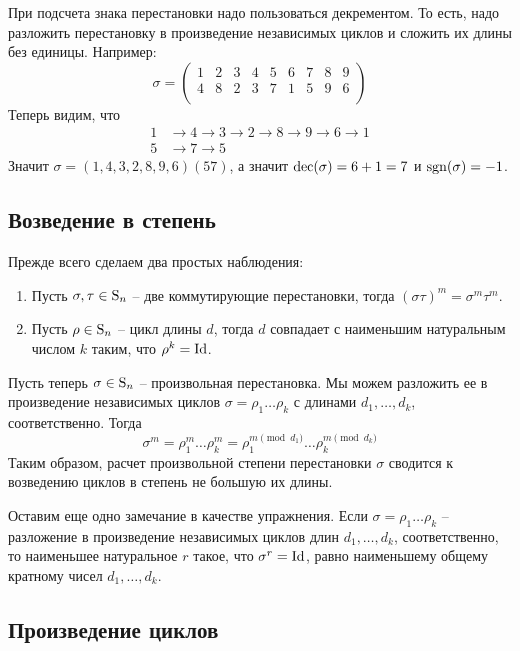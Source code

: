 При подсчета знака перестановки надо пользоваться декрементом. То есть, надо разложить перестановку в произведение независимых циклов и сложить их длины без единицы. Например:
\[
\sigma = 
\begin{pmatrix}
{1}&{2}&{3}&{4}&{5}&{6}&{7}&{8}&{9}\\
{4}&{8}&{2}&{3}&{7}&{1}&{5}&{9}&{6}\\
\end{pmatrix}
\]
Теперь видим, что
\begin{align*}
1 &\to 4 \to 3 \to 2 \to 8 \to 9 \to 6 \to 1\\
5 &\to 7 \to 5
\end{align*}
Значит $\sigma = (1,4,3,2,8,9,6)(57)$, а значит $\operatorname{dec}(\sigma) = 6 + 1 = 7$ и $\operatorname{sgn}(\sigma) = -1$.

\subsection{Возведение в степень}

Прежде всего сделаем два простых наблюдения:
\begin{enumerate}
\item Пусть $\sigma, \tau\in \operatorname{S}_{n}$ -- две коммутирующие перестановки, тогда $(\sigma \tau)^m = \sigma^m \tau^m$.

\item Пусть $\rho \in\operatorname{S}_{n}$ -- цикл длины $d$, тогда $d$ совпадает с наименьшим натуральным числом $k$ таким, что $\rho^k = \operatorname{Id}$.
\end{enumerate}

Пусть теперь $\sigma\in\operatorname{S}_{n}$ -- произвольная перестановка. Мы можем разложить ее в произведение независимых циклов $\sigma = \rho_1 \ldots \rho_k$ с длинами $d_1, \ldots, d_k$, соответственно. Тогда 
\[
\sigma^m = \rho_1^m \ldots \rho_k^m = \rho_1^{m\pmod{d_1}}\ldots \rho_k^{m \pmod{d_k}}
\]
Таким образом, расчет произвольной степени перестановки $\sigma$ сводится к возведению циклов в степень не большую их длины.

Оставим еще одно замечание в качестве упражнения. Если $\sigma = \rho_1\ldots \rho_k$ -- разложение в произведение независимых циклов длин $d_1,\ldots,d_k$, соответственно, то наименьшее натуральное $r$ такое, что $\sigma^r = \operatorname{Id}$, равно наименьшему общему кратному чисел $d_1,\ldots,d_k$.


\subsection{Произведение циклов}

